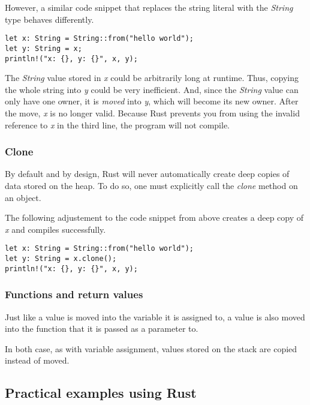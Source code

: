 \documentclass[sigplan,11pt,nonacm]{acmart}
\begin{document}
However, a similar code snippet that replaces the string literal with the \emph{String} type behaves differently.
\begin{lstlisting}
let x: String = String::from("hello world");
let y: String = x;
println!("x: {}, y: {}", x, y);
\end{lstlisting}
The \emph{String} value stored in \emph{x} could be arbitrarily long at runtime.
Thus, copying the whole string into \emph{y} could be very inefficient.
And, since the \emph{String} value can only have one owner, it is \emph{moved} into \emph{y}, which will become its new owner.
After the move, \emph{x} is no longer valid.
Because Rust prevents you from using the invalid reference to \emph{x} in the third line, the program will not compile.

\cite{rust-book}



\subsubsection{Clone}

By default and by design, Rust will never automatically create deep copies of data stored on the heap.
To do so, one must explicitly call the \emph{clone} method on an object.

The following adjustement to the code snippet from above creates a deep copy of \emph{x} and compiles successfully.
\begin{lstlisting}
let x: String = String::from("hello world");
let y: String = x.clone();
println!("x: {}, y: {}", x, y);
\end{lstlisting}

\cite{rust-book}

\subsubsection{Functions and return values}

Just like a value is moved into the variable it is assigned to, a value is also moved into the function that it is passed as a parameter to.

In both case, as with variable assignment, values stored on the stack are copied instead of moved.


\cite{rust-book}

\subsection{Practical examples using Rust}
\end{document}
